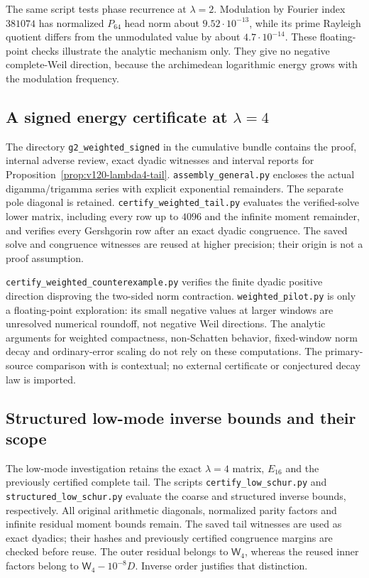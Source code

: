\documentclass[11pt]{article}
\theoremstyle{remark}
\begin{document}
The same script tests phase recurrence at $\lambda=2$. Modulation by
Fourier index $381074$ has normalized $P_{64}$ head norm about
$9.52\cdot10^{-13}$, while its prime Rayleigh quotient differs from
the unmodulated value by about $4.7\cdot10^{-14}$.
These floating-point checks illustrate the analytic mechanism only.
They give no negative complete-Weil direction, because the
archimedean logarithmic energy grows with the modulation frequency.

\subsection*{A signed energy certificate at $\lambda=4$}
The directory \texttt{g2\_weighted\_signed} in the cumulative bundle
contains the proof, internal adverse review, exact dyadic witnesses
and interval reports for Proposition~\ref{prop:v120-lambda4-tail}.
\texttt{assembly\_general.py} encloses the actual digamma/trigamma
series with explicit exponential remainders. The separate pole diagonal
is retained. \texttt{certify\_weighted\_tail.py} evaluates the
verified-solve lower matrix, including every row up to $4096$ and the
infinite moment remainder, and verifies every Gershgorin row after an
exact dyadic congruence. The saved solve and congruence witnesses are
reused at higher precision; their origin is not a proof assumption.

\texttt{certify\_weighted\_counterexample.py} verifies the finite
dyadic positive direction disproving the two-sided norm contraction.
\texttt{weighted\_pilot.py} is only a floating-point exploration:
its small negative values at larger windows are unresolved numerical
roundoff, not negative Weil directions. The analytic arguments for
weighted compactness, non-Schatten behavior, fixed-window norm decay
and ordinary-error scaling do not rely on these computations.
The primary-source comparison with \cite{Zhu2026Windows} is contextual;
no external certificate or conjectured decay law is imported.

\subsection*{Structured low-mode inverse bounds and their scope}
The low-mode investigation retains the exact $\lambda=4$ matrix,
$E_{16}$ and the previously certified complete tail. The scripts
\texttt{certify\_low\_schur.py} and
\texttt{structured\_low\_schur.py} evaluate the coarse and structured
inverse bounds, respectively. All original arithmetic diagonals,
normalized parity factors and infinite residual moment bounds remain.
The saved tail witnesses are used as exact dyadics; their hashes and
previously certified congruence margins are checked before reuse.
The outer residual belongs to $\mathsf W_4$, whereas the reused inner
factors belong to $\mathsf W_4-10^{-8}D$. Inverse order justifies
that distinction.
\end{document}
